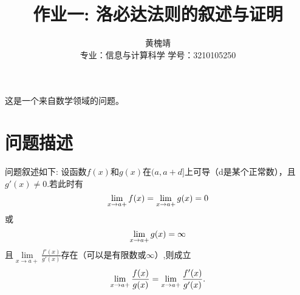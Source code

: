 \documentclass{ctexart}
\title{作业一: 洛必达法则的叙述与证明}
\author{黄槐靖\\ 专业：信息与计算科学  学号：3210105250}
\begin{document}
\maketitle
这是一个来自数学领域的问题。
\section{问题描述}
问题叙述如下: 设函数$f(x)$和$g(x)$在$(a,a+d]$上可导（d是某个正常数），且$g'(x) \neq 0$.若此时有
 \begin{equation}
 \lim_{x \to a+}f(x)=\lim_{x \to a+}g(x)=0\notag
 \end{equation}
或
 \begin{equation}
 \lim_{x \to a+}g(x)=\infty\notag
 \end{equation}
且$\lim\limits_{x \to a+}\frac{f'(x)}{g'(x)}$存在（可以是有限数或$\infty$）,则成立
 \begin{equation}
 \lim_{x \to a+}\frac{f(x)}{g(x)}=\lim_{x \to a+}\frac{f'(x)}{g'(x)}\notag.
 \end{equation}
\end{document}
